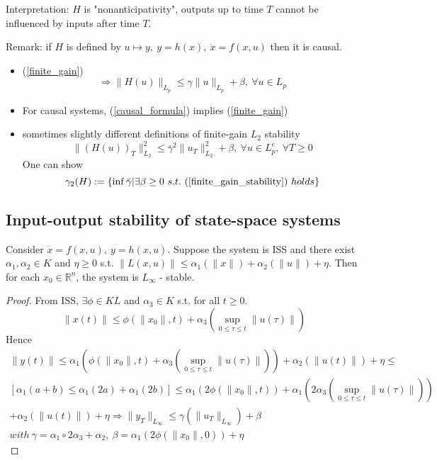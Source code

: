 Interpretation: $H$ is "nonanticipativity", outputs up to time $T$ cannot be influenced by inputs after time $T$.

Remark: if $H$ is defined by $u \mapsto y, \ y = h(x), \ \dot{x} = f(x,u)$ then it is causal.
\begin{itemize}
\item (\ref{finite_gain})
\begin{equation}\label{causal_formula}
\Rightarrow \|H(u)\|_{L_p} \leq \gamma \|u\|_{L_p} + \beta, \ \forall u \in L_p
\end{equation}
\item For causal systems, (\ref{causal_formula}) implies (\ref{finite_gain})
\item sometimes slightly different definitions of finite-gain $L_2$ stability
\begin{equation}\label{finite_gain_stability}
\|(H(u))_T\|^2_{L_2} \leq \bar{\gamma}^2 \|u_T\|^2_{L_2} + \beta, \ \forall u \in L_p^e, \ \forall T \geq 0
\end{equation}
One can show 
\begin{equation*}
\gamma_2(H) := \{ \inf \bar{\gamma} | \exists \beta \geq 0 \ s.t. \ (\ref{finite_gain_stability})\ holds \}
\end{equation*}
\end{itemize}

\subsection{Input-output stability of state-space systems}

\begin{Theorem}
Consider $\dot{x} = f(x,u), \ y = h(x,u)$. Suppose the system is ISS and there exist $\alpha_1, \alpha_2 \in K$ and $\eta \geq 0$ s.t. $\|L(x,u)\| \leq \alpha_1(\|x\|) + \alpha_2(\|u\|) + \eta$. Then for each $x_0 \in \mathbb{R}^n$, the system is $L_{\infty}$ - stable.
\begin{proof}
From ISS, $\exists \phi \in KL$ and $\alpha_3 \in K$ s.t. for all $t \geq 0$.
\begin{equation*}
\|x(t)\| \leq \phi(\|x_0\|, t) + \alpha_3(\sup_{0\leq \tau \leq t}\|u(\tau)\|)
\end{equation*}
Hence 
\begin{equation*}
\begin{split}
\|y(t)\| \leq \alpha_1(\phi (\|x_0\|, t) + \alpha_3(\sup_{ 0 \leq \tau 
\leq t}\|u(\tau)\|)) + \alpha_2(\|u(t)\|) + \eta \leq \\ 
[\alpha_1(a+b) \leq \alpha_1(2a)+\alpha_1(2b)] \leq \alpha_1(2\phi(\|x_0\|,t)) + \alpha_1(2 \alpha_3(\sup_{0 \leq \tau \leq t}\|u(\tau)\|))\\
+ \alpha_2(\|u(t)\|)+\eta \Rightarrow \|y_T\|_{L_{\infty}} \leq \gamma(\|u_T\|_{L_{\infty}}) + \beta \\
with\ \gamma = \alpha_1 \circ 2\alpha_3 + \alpha_2, \ \beta = \alpha_1(2\phi(\|x_0\|,0)) + \eta
\end{split}
\end{equation*}
\end{proof}
\end{Theorem}

